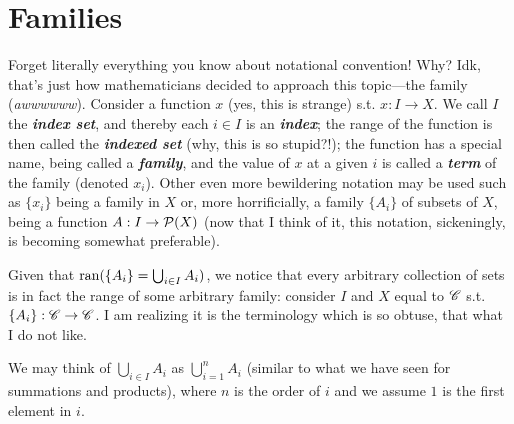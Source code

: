 \documentclass{report}
\begin{document}

\section{Families}

Forget literally everything you know about notational convention! Why? Idk, that's just how mathematicians decided to approach this topic---the family (\textit{awwwwww}). Consider a function \( x \) (yes, this is strange) s.t. \( x : I \to  X \). We call \( I \) the \textbf{\textit{index set}}, and thereby each \( i \in  I \) is an \textbf{\textit{index}}; the range of the function is then called the \textbf{\textit{indexed set}} (why, this is so stupid?!); the function has a special name, being called a \textbf{\textit{family}}, and the value of \( x \) at a given \( i \) is called a \textbf{\textit{term}} of the family (denoted \( x_{i} \)). Other even more bewildering notation may be used such as \( \{x_{i}\}   \) being a family in \( X \) or, more horrificially, a family \( \{A_i\}   \) of subsets of \( X \), being a function \( A : I \to  \mathcal{P}(X)\) (now that I think of it, this notation, sickeningly, is becoming somewhat preferable). 

Given that \( \operatorname{ran} (\{A_i\}= \bigcup_{i \in  I} A_i  ) \), we notice that every arbitrary collection of sets is in fact the range of some arbitrary family: consider \( I \) and \( X \) equal to \( {\mathscr{C}} \) s.t. \( \{A_i\} : {\mathscr{C}} \to  {\mathscr{C}}  \). I am realizing it is the terminology which is so obtuse, that what I do not like. 

We may think of \( \bigcup_{i \in  I}  A_i\) as \( \bigcup^n_{i = 1}  A_i\) (similar to what we have seen for summations and products), where \( n \) is the order of \( i \) and we assume \( 1 \) is the first element in \( i \). 

\end{document}
